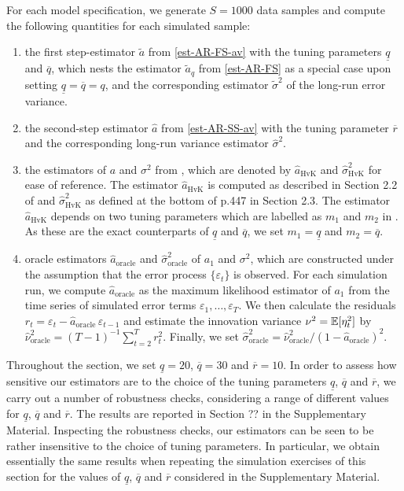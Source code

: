 For each model specification, we generate $S=1000$ data samples and compute the following quantities for each simulated sample: 
\begin{enumerate}[label=(\roman*),leftmargin=0.9cm]
\item the first step-estimator $\widetilde{a}$ from \eqref{est-AR-FS-av} with the tuning parameters $\underline{q}$ and $\overline{q}$, which nests the estimator $\widetilde{a}_q$ from \eqref{est-AR-FS} as a special case upon setting $\underline{q} = \overline{q} = q$, and the corresponding estimator $\widetilde{\sigma}^2$ of the long-run error variance. 
\item the second-step estimator $\widehat{a}$ from \eqref{est-AR-SS-av} with the tuning parameter $\overline{r}$ and the corresponding long-run variance estimator $\widehat{\sigma}^2$. 
\item the estimators of $a$ and $\sigma^2$ from \cite{Hall2003}, which are denoted by $\widehat{a}_{\text{HvK}}$ and $\widehat{\sigma}^2_{\text{HvK}}$ for ease of reference. The estimator $\widehat{a}_{\text{HvK}}$ is computed as described in Section 2.2 of \cite{Hall2003} and $\widehat{\sigma}^2_{\text{HvK}}$ as defined at the bottom of p.447 in Section 2.3. The estimator $\widehat{a}_{\text{HvK}}$ depends on two tuning parameters which are labelled as $m_1$ and $m_2$ in \cite{Hall2003}. As these are the exact counterparts of $\underline{q}$ and $\overline{q}$, we set $m_1 = \underline{q}$ and $m_2 = \overline{q}$. 
\item oracle estimators $\widehat{a}_{\text{oracle}}$ and $\widehat{\sigma}^2_{\text{oracle}}$ of $a_1$ and $\sigma^2$, which are constructed under the assumption that the error process $\{\varepsilon_t\}$ is observed. For each simulation run, we compute $\widehat{a}_{\text{oracle}}$ as the maximum likelihood estimator of $a_1$ from the time series of simulated error terms $\varepsilon_1,\ldots,\varepsilon_T$. We then calculate the residuals $r_t = \varepsilon_t - \widehat{a}_{\text{oracle}} \, \varepsilon_{t-1}$ and estimate the innovation variance $\nu^2 = \mathbb{E}[\eta_t^2]$ by $\widehat{\nu}_{\text{oracle}}^2 = (T-1)^{-1} \sum_{t=2}^T r_t^2$. Finally, we set $\widehat{\sigma}^2_{\text{oracle}} = \widehat{\nu}_{\text{oracle}}^2 / (1 - \widehat{a}_{\text{oracle}})^2$. 
\end{enumerate}
Throughout the section, we set $\underline{q}=20$, $\overline{q}=30$ and $\overline{r} = 10$. In order to assess how sensitive our estimators are to the choice of the tuning parameters $\underline{q}$, $\overline{q}$ and $\overline{r}$, we carry out a number of robustness checks, considering a range of different values for $\underline{q}$, $\overline{q}$ and $\overline{r}$. The results are reported in Section ?? in the Supplementary Material. Inspecting the robustness checks, our estimators can be seen to be rather insensitive to the choice of tuning parameters. In particular, we obtain essentially the same results when repeating the simulation exercises of this section for the values of $\underline{q}$, $\overline{q}$ and $\overline{r}$ considered in the Supplementary Material.


